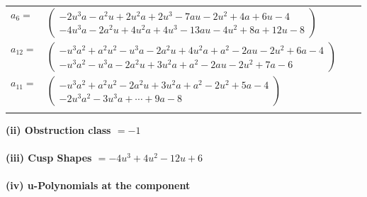 \documentclass[1p]{elsarticle_modified}
\theoremstyle{definition}
\begin{document}
\begin{tabular}{m{7pt} m{180pt} m{7pt} m{180pt} }
\flushright $a_{6}=$&$\begin{pmatrix}-2 u^3 a- a^2 u+2 u^2 a+2 u^3-7 a u-2 u^2+4 a+6 u-4\\-4 u^3 a-2 a^2 u+4 u^2 a+4 u^3-13 a u-4 u^2+8 a+12 u-8\end{pmatrix}$ \\
\flushright $a_{12}=$&$\begin{pmatrix}- u^3 a^2+a^2 u^2- u^3 a-2 a^2 u+4 u^2 a+a^2-2 a u-2 u^2+6 a-4\\- u^3 a^2- u^3 a-2 a^2 u+3 u^2 a+a^2-2 a u-2 u^2+7 a-6\end{pmatrix}$ \\
\flushright $a_{11}=$&$\begin{pmatrix}- u^3 a^2+a^2 u^2-2 a^2 u+3 u^2 a+a^2-2 u^2+5 a-4\\-2 u^3 a^2-3 u^3 a+\cdots+9 a-8\end{pmatrix}$\\&\end{tabular}
\flushleft \textbf{(ii) Obstruction class $= -1$}\\~\\
\flushleft \textbf{(iii) Cusp Shapes $= -4 u^3+4 u^2-12 u+6$}\\~\\
\newpage\renewcommand{\arraystretch}{1}
\flushleft \textbf{(iv) u-Polynomials at the component}\newline \\
\end{document}
